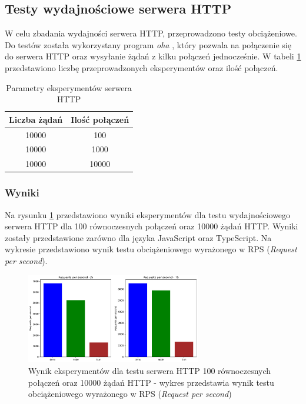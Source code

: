\subsection{Testy wydajnościowe serwera HTTP}
W celu zbadania wydajności serwera HTTP, przeprowadzono testy obciążeniowe. Do testów została wykorzystany program \textit{oha} \cite{oha}, który pozwala na połączenie się do serwera HTTP oraz wysyłanie żądań z kilku połączeń jednocześnie. W tabeli \ref{tab:http_experiments} przedstawiono liczbę przeprowadzonych eksperymentów oraz ilość połączeń.

\begin{table}[H]
  \centering
  \caption{Parametry eksperymentów serwera HTTP}
  \begin{tabular}{|c|c|}
    \hline
    \textbf{Liczba żądań} & \textbf{Ilość połączeń}\\ \hline
    10000 & 100 \\ \hline
    10000 & 1000 \\ \hline
    10000 & 10000 \\ \hline
  \end{tabular}
  \label{tab:http_experiments}
\end{table}

\subsubsection{Wyniki}
Na rysunku \ref{fig:server_e1} przedstawiono wyniki eksperymentów dla testu wydajnościowego serwera HTTP dla 100 równoczesnych połączeń oraz 10000 żądań HTTP. Wyniki zostały przedstawione zarówno dla języka JavaScript oraz TypeScript. Na wykresie przedstawiono wynik testu obciążeniowego wyrażonego w RPS (\textit{Request per second}).

\begin{figure}[H]
  \centering
  \includegraphics[width=0.68\textwidth]{Figures/server/server_100_10000.png}
  \caption{Wynik eksperymentów dla testu serwera HTTP 100 równoczesnych połączeń oraz 10000 żądań HTTP - wykres przedstawia wynik testu obciążeniowego wyrażonego w RPS (\textit{Request per second})}
  \label{fig:server_e1}
\end{figure}

